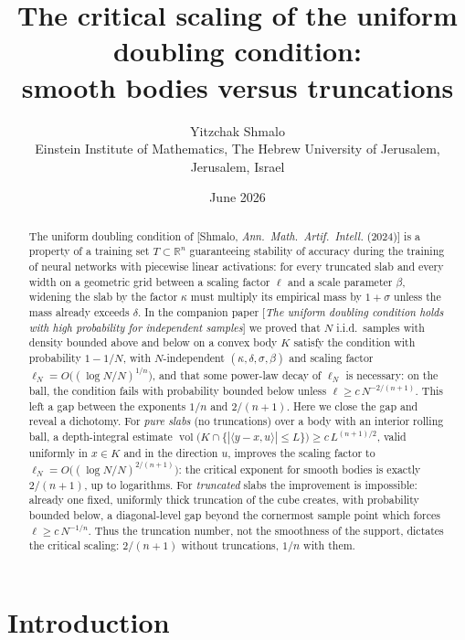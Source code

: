 ﻿\documentclass[11pt]{article}
\title{The critical scaling of the uniform doubling condition:\\
smooth bodies versus truncations}
\author{Yitzchak Shmalo\\
\small Einstein Institute of Mathematics, The Hebrew University of Jerusalem, Jerusalem, Israel\\
\small }
\date{June 2026}
\newcommand{\R}{\mathbb{R}}
\newcommand{\vol}{\operatorname{vol}}
\begin{document}
\maketitle

\begin{abstract}
The uniform doubling condition of [Shmalo, \emph{Ann.\ Math.\ Artif.\ Intell.}
(2024)] is a property of a training set $T\subset\R^n$ guaranteeing stability of
accuracy during the training of neural networks with piecewise linear
activations: for every truncated slab and every width on a geometric grid between
a scaling factor $\ell$ and a scale parameter $\beta$, widening the slab by the
factor $\kappa$ must multiply its empirical mass by $1+\sigma$ unless the mass
already exceeds $\delta$.  In the companion paper [\emph{The uniform doubling
condition holds with high probability for independent samples}] we proved that
$N$ i.i.d.\ samples with density bounded above and below on a convex body $K$
satisfy the condition with probability $1-1/N$, with $N$-independent
$(\kappa,\delta,\sigma,\beta)$ and scaling factor
$\ell_N=O\bigl((\log N/N)^{1/n}\bigr)$, and that some power-law decay of
$\ell_N$ is necessary: on the ball, the condition fails with probability bounded
below unless $\ell\ge c\,N^{-2/(n+1)}$.  This left a gap between the exponents
$1/n$ and $2/(n+1)$.  Here we close the gap and reveal a dichotomy.  For
\emph{pure slabs} (no truncations) over a body with an interior rolling ball, a
depth-integral estimate
$\vol\bigl(K\cap\{|\langle y-x,u\rangle|\le L\}\bigr)\ge c\,L^{(n+1)/2}$, valid
uniformly in $x\in K$ and in the direction $u$, improves the scaling factor to
$\ell_N=O\bigl((\log N/N)^{2/(n+1)}\bigr)$: the critical exponent for smooth
bodies is exactly $2/(n+1)$, up to logarithms.  For \emph{truncated} slabs the
improvement is impossible: already one fixed, uniformly thick truncation of the
cube creates, with probability bounded below, a diagonal-level gap beyond the
cornermost sample point which forces $\ell\ge c\,N^{-1/n}$.  Thus the truncation
number, not the smoothness of the support, dictates the critical scaling:
$2/(n+1)$ without truncations, $1/n$ with them.
\end{abstract}

\section{Introduction}\label{sec:intro}
\end{document}
